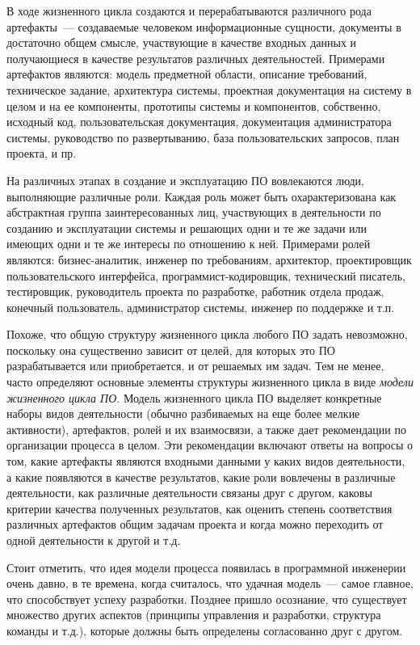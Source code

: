 \documentclass{../../text-style}
\begin{document}
В ходе жизненного цикла создаются и перерабатываются различного рода артефакты~--- создаваемые человеком информационные сущности, документы в достаточно общем смысле, участвующие в качестве входных данных и получающиеся в качестве результатов различных деятельностей. Примерами артефактов являются: модель предметной области, описание требований, техническое задание, архитектура системы, проектная документация на систему в целом и на ее компоненты, прототипы системы и компонентов, собственно, исходный код, пользовательская документация, документация администратора системы, руководство по развертыванию, база пользовательских запросов, план проекта, и пр.

На различных этапах в создание и эксплуатацию ПО вовлекаются люди, выполняющие различные роли. Каждая роль может быть охарактеризована как абстрактная группа заинтересованных лиц, участвующих в деятельности по созданию и эксплуатации системы и решающих одни и те же задачи или имеющих одни и те же интересы по отношению к ней. Примерами ролей являются: бизнес-аналитик, инженер по требованиям, архитектор, проектировщик пользовательского интерфейса, программист-кодировщик, технический писатель, тестировщик, руководитель проекта по разработке, работник отдела продаж, конечный пользователь, администратор системы, инженер по поддержке и т.п.

Похоже, что общую структуру жизненного цикла любого ПО задать невозможно, поскольку она существенно зависит от целей, для которых это ПО разрабатывается или приобретается, и от решаемых им задач. Тем не менее, часто определяют основные элементы структуры жизненного цикла в виде \emph{модели жизненного цикла ПО}. Модель жизненного цикла ПО выделяет конкретные наборы видов деятельности (обычно разбиваемых на еще более мелкие активности), артефактов, ролей и их взаимосвязи, а также дает рекомендации по организации процесса в целом. Эти рекомендации включают ответы на вопросы о том, какие артефакты являются входными данными у каких видов деятельности, а какие появляются в качестве результатов, какие роли вовлечены в различные деятельности, как различные деятельности связаны друг с другом, каковы критерии качества полученных результатов, как оценить степень соответствия различных артефактов общим задачам проекта и когда можно переходить от одной деятельности к другой и т.д.

Стоит отметить, что идея модели процесса появилась в программной инженерии очень давно, в те времена, когда считалось, что удачная модель~--- самое главное, что способствует успеху разработки. Позднее пришло осознание, что существует множество других аспектов (принципы управления и разработки, структура команды и т.д.), которые должны быть определены согласованно друг с другом.
\end{document}
